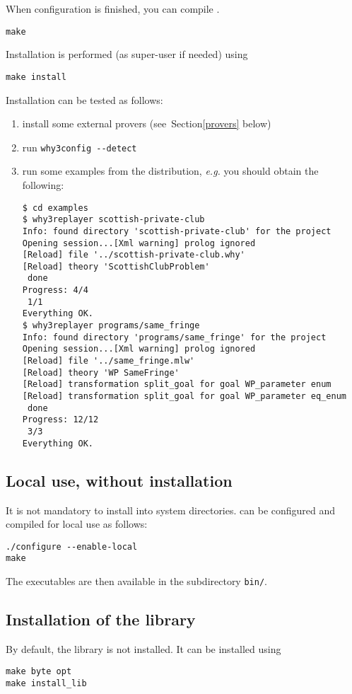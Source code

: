 When configuration is finished, you can compile \why.
\begin{verbatim}
make
\end{verbatim}
Installation is performed (as super-user if needed) using
\begin{verbatim}
make install
\end{verbatim}
Installation can be tested as follows: 
\begin{enumerate}
\item install some external provers (see~Section\ref{provers} below)
\item run \verb|why3config --detect|
\item run some examples from the distribution, \emph{e.g.} you should
obtain the following:
\begin{verbatim}
$ cd examples
$ why3replayer scottish-private-club
Info: found directory 'scottish-private-club' for the project
Opening session...[Xml warning] prolog ignored
[Reload] file '../scottish-private-club.why'
[Reload] theory 'ScottishClubProblem'
 done
Progress: 4/4
 1/1
Everything OK.
$ why3replayer programs/same_fringe
Info: found directory 'programs/same_fringe' for the project
Opening session...[Xml warning] prolog ignored
[Reload] file '../same_fringe.mlw'
[Reload] theory 'WP SameFringe'
[Reload] transformation split_goal for goal WP_parameter enum 
[Reload] transformation split_goal for goal WP_parameter eq_enum 
 done
Progress: 12/12
 3/3
Everything OK.
\end{verbatim}
\end{enumerate}

\subsection{Local use, without installation}

It is not mandatory to install \why into system directories.
\why can be configured and compiled for local use as follows:
\begin{verbatim}
./configure --enable-local
make
\end{verbatim}
The \why executables are then available in the subdirectory \texttt{bin/}.

\subsection{Installation of the \why library}
\label{sec:installlib}

By default, the \why library is not installed. It can be installed using
\begin{verbatim}
make byte opt
make install_lib
\end{verbatim}

